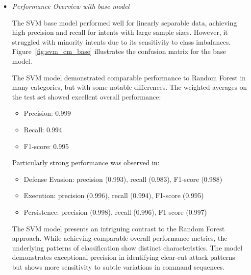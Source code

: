             \begin{itemize}
        
                \item \textit{Performance Overview with base model}
                
                    \vspace{0.3em}
                    

                    The SVM base model performed well for linearly separable data, achieving high precision and recall for intents with large sample sizes. However, it struggled with minority intents due to its sensitivity to class imbalances. Figure~\ref{fig:svm_cm_base} illustrates the confusion matrix for the base model.
                    
                    
                    The SVM model demonstrated comparable performance to Random Forest in many categories, but with some notable differences. The weighted averages on the test set showed excellent overall performance:
                    
                    \begin{itemize}
                        \item Precision: 0.999
                        \item Recall: 0.994
                        \item F1-score: 0.995
                    \end{itemize}

                    Particularly strong performance was observed in:
                    
                    \begin{itemize}
                        \item Defense Evasion: precision (0.993), recall (0.983), F1-score (0.988)
                        \item Execution: precision (0.996), recall (0.994), F1-score (0.995)
                        \item Persistence: precision (0.998), recall (0.996), F1-score (0.997)
                    \end{itemize}
                    
                    
                    The SVM model presents an intriguing contrast to the Random Forest approach. While achieving comparable overall performance metrics, the underlying patterns of classification show distinct characteristics. The model demonstrates exceptional precision in identifying clear-cut attack patterns but shows more sensitivity to subtle variations in command sequences.
            

\end{itemize}
